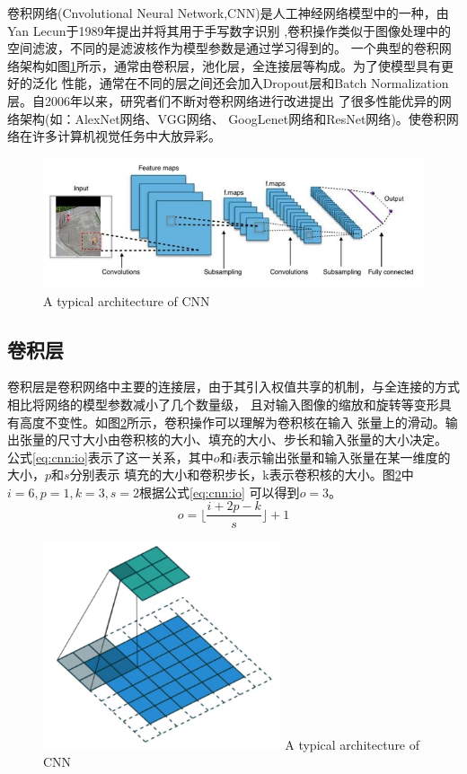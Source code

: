 	卷积网络(Cnvolutional Neural Network,CNN)是人工神经网络模型中的一种，由Yan Lecun于1989年提出并将其用于手写数字识别
	\cite{le1989handwritten},卷积操作类似于图像处理中的空间滤波，不同的是滤波核作为模型参数是通过学习得到的。
	一个典型的卷积网络架构如图\ref{fig:chap4:cnn}所示，通常由卷积层，池化层，全连接层等构成。为了使模型具有更好的泛化
	性能，通常在不同的层之间还会加入Dropout层和Batch Normalization层。自2006年以来，研究者们不断对卷积网络进行改进提出
	了很多性能优异的网络架构(如：AlexNet网络\cite{krizhevsky2012imagenet}、VGG网络\cite{simonyan2014very}、
	GoogLenet网络\cite{szegedy2015going}和ResNet网络\cite{Kaiming2015Deep})。使卷积网络在许多计算机视觉任务中大放异彩。
	\begin{figure}[h]
	  \centering
	  \includegraphics[width=12cm]{figure/chap4/CNN-arch.png}
		{A typical architecture of CNN}
	  \label{fig:chap4:cnn}
	\end{figure}
\subsection{卷积层}
	卷积层是卷积网络中主要的连接层，由于其引入权值共享的机制，与全连接的方式相比将网络的模型参数减小了几个数量级，
	且对输入图像的缩放和旋转等变形具有高度不变性。如图\ref{fig:chap4:cnn-op}所示，卷积操作可以理解为卷积核在输入
	张量上的滑动。输出张量的尺寸大小由卷积核的大小、填充的大小、步长和输入张量的大小决定。
	公式\ref{eq:cnn:io}表示了这一关系，其中$o$和$i$表示输出张量和输入张量在某一维度的大小，$p$和$s$分别表示
	填充的大小和卷积步长，k表示卷积核的大小。图\ref{fig:chap4:cnn-op}中$i=6,p=1,k=3,s=2$根据公式\ref{eq:cnn:io}
	可以得到$o=3$。
	\begin{equation}
		o = \lfloor \frac{i+2p-k}{s} \rfloor +1 \label{eq:cnn:io}
	\end{equation}
	
	\begin{figure}[h]
	  \centering
	  \includegraphics[width=7cm]{figure/chap4/CNN-op.jpg}
		{A typical architecture of CNN}
	  \label{fig:chap4:cnn-op}
	\end{figure}
